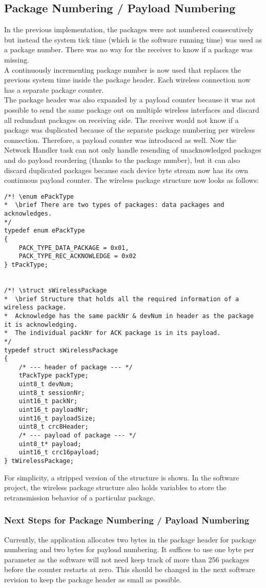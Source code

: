 \subsection{Package Numbering / Payload Numbering}
In the previous implementation, the packages were not numbered consecutively but instead the system tick time (which is the software running time) was used as a package number. There was no way for the receiver to know if a package was missing.\\
A continuously incrementing package number is now used that replaces the previous system time inside the package header. Each wireless connection now has a separate package counter.\\
The package header was also expanded by a payload counter because it was not possible to send the same package out on multiple wireless interfaces and discard all redundant packages on receiving side. The receiver would not know if a package was duplicated because of the separate package numbering per wireless connection. Therefore, a payload counter was introduced as well. Now the Network Handler task can not only handle resending of unacknowledged packages and do payload reordering (thanks to the package number), but it can also discard duplicated packages because each device byte stream now has its own continuous payload counter. The wireless package structure now looks as follows: \newpage
\begin{lstlisting}
/*! \enum ePackType
*  \brief There are two types of packages: data packages and acknowledges.
*/
typedef enum ePackType
{
    PACK_TYPE_DATA_PACKAGE = 0x01,
    PACK_TYPE_REC_ACKNOWLEDGE = 0x02
} tPackType;


/*! \struct sWirelessPackage
*  \brief Structure that holds all the required information of a wireless package.
*  Acknowledge has the same packNr & devNum in header as the package it is acknowledging.
*  The individual packNr for ACK package is in its payload.
*/
typedef struct sWirelessPackage
{
    /* --- header of package --- */
    tPackType packType;
    uint8_t devNum;
    uint8_t sessionNr;
    uint16_t packNr;
    uint16_t payloadNr;
    uint16_t payloadSize;
    uint8_t crc8Header;
    /* --- payload of package --- */
    uint8_t* payload;
    uint16_t crc16payload;
} tWirelessPackage;
\end{lstlisting}
For simplicity, a stripped version of the structure is shown. In the software project, the wireless package structure also holds variables to store the retransmission behavior of a particular package.
%
\subsubsection{Next Steps for Package Numbering / Payload Numbering}
Currently, the application allocates two bytes in the package header for package numbering and two bytes for payload numbering. It suffices to use one byte per parameter as the software will not need keep track of more than 256 packages before the counter restarts at zero. This should be changed in the next software revision to keep the package header as small as possible.
%
%
